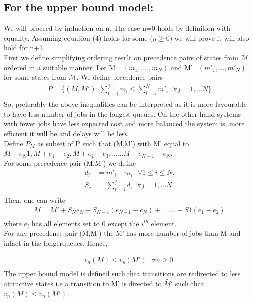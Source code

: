 \documentclass[a4paper,english,12pt]{article}
\begin{document}
\subsection{For the upper bound model:}
We will proceed by induction on n. The case n=0 holds by definition with equality. Assuming equation (4) holds for some ($n\ge0$) we will prove it will also hold for n+1.
\\First we define simplifying ordering result on precedence pairs of states from $\mathcal{M}$ ordered in a suitable manner. Let M= $(m_1,….,m_N)$ and M'=$(m'_1,...,m'_N)$ for some states from  $\mathcal{M}$. We define precedence pairs
\begin{align*}
P = \{(M,M'): \sum_{i=1}^{j}m_i \le \sum_{i=1}^{N}m'_i  \text{       }\forall j=1,...N \}\\
\end{align*}
So, preferably the above inequalities can be interpreted as it is more favourable to have less number of jobs in the longest queues. On the other hand systems with fewer jobs have less expected cost and more balanced the system is, more efficient it will be and delays will be less.\\
Define $P_M$ as subset of P such that (M,M') with M' equal to $M+e_N1, M+e_1-e_2, M+e_2-e_3,......M+e_{N-1}-e_{N}$.\\
For some precedence pair (M,M') we define \\
\begin{align*}
d_i &= m'_i - m_i \text{     }\forall  1 \le i \le N.\\
S_j &=  \sum_{i=1}^{j}d_i  \text{       }\forall  j=1,...N.\\
\end{align*}
Then, one can write
\begin{align*}
 M = M'+S_Ne_N+S_{N-1}(e_{N-1}-e_{N})+.......+S1(e_1-e_2)\\
\end{align*}
where $e_i$ has all elements set to 0 except the $i^{th}$ element.\\
For any precedence pair (M,M') the M' has more number of jobs than M and infact in the longerqueues. Hence,

\begin{align*}
v_n(M) \le v_n(M') \text{    } \forall n \ge 0.\\
\end{align*}
The upper bound model is defined such that transitions are redirected to less attractive states i.e a transition to M' is directed to $\tilde{M'}$ such that $v_n(M) \le v_n(M')$.
\end{document}

